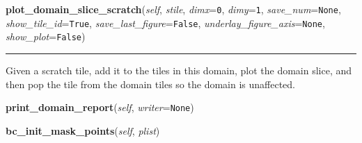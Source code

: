     \label{Tiling:Domain:plot_domain_slice_scratch}

    \vspace{0.5ex}

\hspace{.8\funcindent}\begin{boxedminipage}{\funcwidth}

    \raggedright \textbf{plot\_domain\_slice\_scratch}(\textit{self}, \textit{stile}, \textit{dimx}={\tt 0}, \textit{dimy}={\tt 1}, \textit{save\_num}={\tt None}, \textit{show\_tile\_id}={\tt True}, \textit{save\_last\_figure}={\tt False}, \textit{underlay\_figure\_axis}={\tt None}, \textit{show\_plot}={\tt False})

    \vspace{-1.5ex}

    \rule{\textwidth}{0.5\fboxrule}
\setlength{\parskip}{2ex}
    Given a scratch tile, add it to the tiles in this domain, plot the 
    domain slice, and then pop the tile from the domain tiles so the domain
    is unaffected.

\setlength{\parskip}{1ex}
    \end{boxedminipage}

    \label{Tiling:Domain:print_domain_report}

    \vspace{0.5ex}

\hspace{.8\funcindent}\begin{boxedminipage}{\funcwidth}

    \raggedright \textbf{print\_domain\_report}(\textit{self}, \textit{writer}={\tt None})

\setlength{\parskip}{2ex}
\setlength{\parskip}{1ex}
    \end{boxedminipage}

    \label{Tiling:Domain:bc_init_mask_points}

    \vspace{0.5ex}

\hspace{.8\funcindent}\begin{boxedminipage}{\funcwidth}

    \raggedright \textbf{bc\_init\_mask\_points}(\textit{self}, \textit{plist})

\setlength{\parskip}{2ex}
\setlength{\parskip}{1ex}
    \end{boxedminipage}

